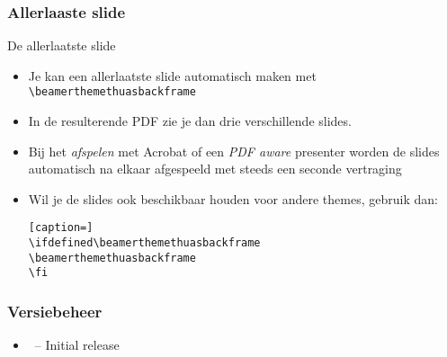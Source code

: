 \documentclass[fleqn,aspectratio=169,dutch,10pt]{beamer}
\begin{document}
\begin{frame}[fragile]
\frametitle{Allerlaaste slide}
De allerlaatste slide
\begin{itemize}
\item Je kan een allerlaatste slide automatisch maken met \lstinline|\beamerthemethuasbackframe|
\item In de resulterende PDF zie je dan drie verschillende slides.
\item Bij het \textsl{afspelen} met Acrobat of een \textsl{PDF aware} presenter worden de slides automatisch na elkaar afgespeeld met steeds een seconde vertraging
\item Wil je de slides ook beschikbaar houden voor andere themes, gebruik dan:
\begin{lstlisting}[caption=]
\ifdefined\beamerthemethuasbackframe
\beamerthemethuasbackframe
\fi
\end{lstlisting}
\end{itemize}
\end{frame}

\beamerthemethuasbackframe


\subtitle{Dit is een tweede titelslide}
\maketitle


\begin{frame}
\frametitle{Versiebeheer}
\begin{itemize}
\item \beamerthemethuasversion\ -- Initial release
\end{itemize}
\end{frame}

%
%
%
%
\end{document}
